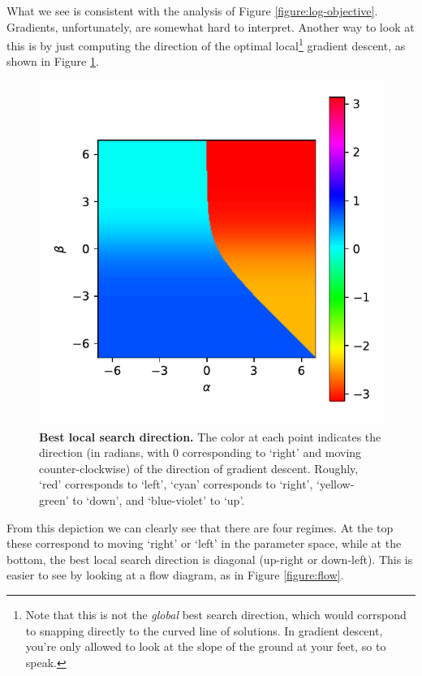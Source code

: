 \documentclass{article}
\begin{document}
What we see is consistent with the analysis of Figure \ref{figure:log-objective}.  Gradients, unfortunately, are somewhat hard to interpret.  Another way to look at this is by just computing the direction of the optimal local\footnote{Note that this is not the \textit{global} best search direction, which would corrspond to snapping directly to the curved line of solutions.  In gradient descent, you're only allowed to look at the slope of the ground at your feet, so to speak.} gradient descent, as shown in Figure \ref{figure:search-direction}.

\begin{figure}[!ht]
\centering
\includegraphics{figure5-best_local_search_direction}
\caption{\textbf{Best local search direction.}  The color at each point indicates the direction (in radians, with 0 corresponding to `right' and moving counter-clockwise) of the direction of gradient descent.  Roughly, `red' corresponds to `left', `cyan' corresponds to `right', `yellow-green' to `down', and `blue-violet' to `up'.}
\label{figure:search-direction}
\end{figure}

From this depiction we can clearly see that there are four regimes.  At the top these correspond to moving `right' or `left' in the parameter space, while at the bottom, the best local search direction is diagonal (up-right or down-left).  This is easier to see by looking at a flow diagram, as in Figure \ref{figure:flow}.
\end{document}
